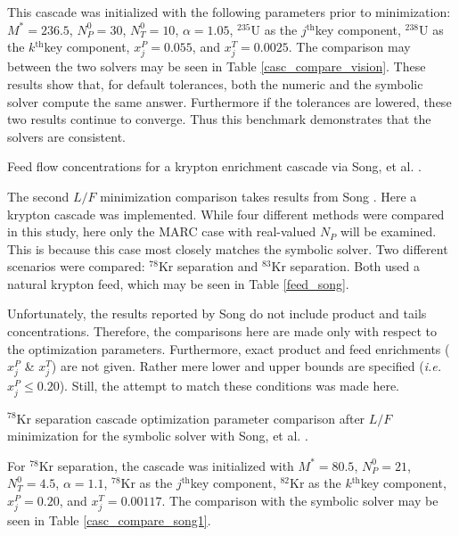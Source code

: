 \documentclass[preprint,12pt]{elsarticle}
\newcommand{\superscript}[1]{\ensuremath{^{\textrm{#1}}}}
\newcommand{\nuc}[2]{\superscript{#2}{#1}}
\newcommand{\jth}[0]{$j$\superscript{th}}
\newcommand{\kth}[0]{$k$\superscript{th}}
\begin{document}
This cascade was initialized with the following parameters prior to minimization: 
$M^*=236.5$, $N_P^0=30$, $N_T^0=10$, $\alpha=1.05$, \nuc{U}{235} as the \jth key 
component, \nuc{U}{238} as the \kth key component, $x_j^P=0.055$, and 
$x_j^T=0.0025$.  The comparison may between the two solvers may be seen in Table
\ref{casc_compare_vision}.  These results show that, for default tolerances, 
both the numeric and the symbolic solver compute the same answer.  Furthermore
if the tolerances are lowered, these two results continue to converge.  Thus this 
benchmark demonstrates that the solvers are consistent.

\begin{table}[htbp]
\begin{center}
\caption{Feed flow concentrations for a krypton enrichment cascade via  
    Song, et al. \cite{doi:10.1080/01496391003793884}.}

\end{center}
\label{feed_song}
\end{table}

The second $L/F$ minimization comparison takes results from Song 
\cite{doi:10.1080/01496391003793884}.  Here a krypton
cascade was implemented.  While four different methods were compared in this study, 
here only the MARC case with real-valued $N_P$  will be examined.  This is because
this case most closely matches the symbolic solver.  Two different scenarios were
compared: \nuc{Kr}{78} separation and \nuc{Kr}{83} separation.  Both used a 
natural krypton feed, which may be seen in Table \ref{feed_song}.

Unfortunately, the results reported by Song do not include product and tails 
concentrations.  Therefore, the comparisons here are made only with respect to 
the optimization parameters.  Furthermore, exact product and feed enrichments
($x_j^P$ \& $x_j^T$) are not given. Rather mere lower and upper bounds are specified
(\emph{i.e.} $x_j^P\le0.20$).
Still, the attempt to match these conditions was made here.

\begin{table}[htbp]
\begin{center}
\caption{\nuc{Kr}{78} separation cascade optimization parameter comparison after 
    $L/F$ minimization for the symbolic 
    solver with Song, et al. \cite{doi:10.1080/01496391003793884}.}

\end{center}
\label{casc_compare_song1}
\end{table}

For \nuc{Kr}{78} separation, the cascade was initialized with $M^*=80.5$, 
$N_P^0=21$, $N_T^0=4.5$, $\alpha=1.1$, \nuc{Kr}{78} as the \jth key
component, \nuc{Kr}{82} as the \kth key component, $x_j^P=0.20$, and
$x_j^T=0.00117$.  The comparison with the symbolic solver may be seen in Table
\ref{casc_compare_song1}.
\end{document}
